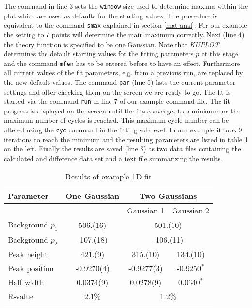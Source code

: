 The command in line 3 sets the {\tt window} size used to determine
maxima within the plot which are used as defaults for the starting
values. The procedure is equivalent to the command {\tt smax}
explained in section \ref{mat-anal}. For our example the setting to
7 points will determine the main maximum correctly. Next (line 4)
the theory function is specified to be one Gaussian. Note that {\it
KUPLOT} determines the default starting values for the fitting
parameters $p$ at this stage and the command {\tt mfen} has to be
entered before to have an effect. Furthermore all current values of
the fit parameters, e.g. from a previous run, are replaced by the
new default values. The command {\tt par} (line 5) lists the current
parameter settings and after checking them on the screen we are
ready to go. The fit is started via the command {\tt run} in line 7
of our example command file. The fit progress is displayed on the
screen until the fits converges to a minimum or the maximum number
of cycles is reached. This maximum cycle number can be altered using
the {\tt cyc} command in the fitting sub level. In our example it
took 9 iterations to reach the minimum and the resulting parameters
are listed in table \ref{fit-tab1} on the left. Finally the results
are saved (line 8) as two data files containing the calculated and
difference data set and a text file summarizing the results.

\begin{table}[!t]
\centering
\begin{tabular}[b]{|l|c|c|c|}
  \hline
  {\bf Parameter} & {\bf One Gaussian} &
       \multicolumn{2}{|c|}{\bf Two Gaussians} \\
  \hline
            &     &      Gaussian 1 & Gaussian 2 \\
  \hline\hline
   Background $p_{1}$ &  506.(16)   & \multicolumn{2}{|c|}{  501.(10)} \\
   Background $p_{2}$ & -107.(18)   & \multicolumn{2}{|c|}{ -106.(11)} \\
  \hline
   Peak height        &  421.(9)    &  315.(10)  &   134.(10)   \\
   Peak position      & -0.9270(4) & -0.9277(3)  &  -0.9250$^{*}$ \\
   Half width         &  0.0374(9) &  0.0278(9)  &   0.0640$^{*}$ \\
  \hline
   R-value            &  2.1\%     &   \multicolumn{2}{|c|}{ 1.2\%} \\
  \hline
\end{tabular}
\caption{\label{fit-tab1}Results of example 1D fit}
\end{table}

